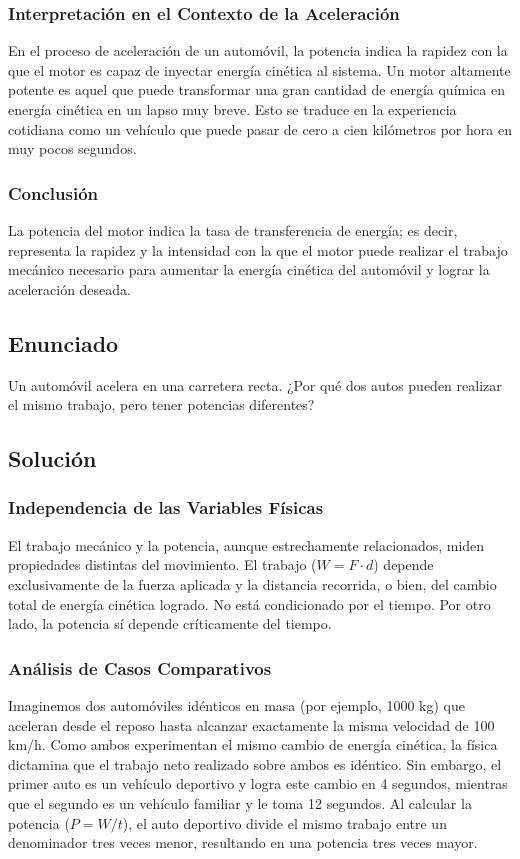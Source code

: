 \documentclass[a4paper,12pt]{article}
\begin{document}
\subsubsection*{Interpretación en el Contexto de la Aceleración}
En el proceso de aceleración de un automóvil, la potencia indica la rapidez con la que el motor es capaz de inyectar energía cinética al sistema. Un motor altamente potente es aquel que puede transformar una gran cantidad de energía química en energía cinética en un lapso muy breve. Esto se traduce en la experiencia cotidiana como un vehículo que puede pasar de cero a cien kilómetros por hora en muy pocos segundos.

\subsubsection*{Conclusión}
La potencia del motor indica la tasa de transferencia de energía; es decir, representa la rapidez y la intensidad con la que el motor puede realizar el trabajo mecánico necesario para aumentar la energía cinética del automóvil y lograr la aceleración deseada.

\newpage
\subsection*{Enunciado}
Un automóvil acelera en una carretera recta. 
¿Por qué dos autos pueden realizar el mismo trabajo, pero tener potencias diferentes?

\subsection*{Solución}

\subsubsection*{Independencia de las Variables Físicas}
El trabajo mecánico y la potencia, aunque estrechamente relacionados, miden propiedades distintas del movimiento. El trabajo ($W = F \cdot d$) depende exclusivamente de la fuerza aplicada y la distancia recorrida, o bien, del cambio total de energía cinética logrado. No está condicionado por el tiempo. Por otro lado, la potencia sí depende críticamente del tiempo.

\subsubsection*{Análisis de Casos Comparativos}
Imaginemos dos automóviles idénticos en masa (por ejemplo, 1000 kg) que aceleran desde el reposo hasta alcanzar exactamente la misma velocidad de 100 km/h. Como ambos experimentan el mismo cambio de energía cinética, la física dictamina que el trabajo neto realizado sobre ambos es idéntico. 
Sin embargo, el primer auto es un vehículo deportivo y logra este cambio en 4 segundos, mientras que el segundo es un vehículo familiar y le toma 12 segundos. Al calcular la potencia ($P = W / t$), el auto deportivo divide el mismo trabajo entre un denominador tres veces menor, resultando en una potencia tres veces mayor.
\end{document}
